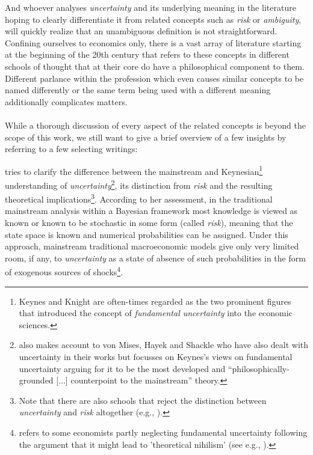 \documentclass[a4paper,11pt,listof=nochaptergap,oneside,pointednumbers,bibtotoc,bigheadings,liststotoc,hidelinks]{scrbook}
\theoremstyle{mysatz}
\theoremstyle{mydefinition}
\theoremstyle{mytheorem}
\theoremstyle{mybemerkung}
\begin{document}
And whoever analyses \textit{uncertainty} and its underlying meaning in the literature hoping to clearly differentiate it from related concepts such as \textit{risk} or \textit{ambiguity}, will quickly realize that an unambiguous definition is not straightforward. Confining ourselves to economics only, there is a vast array of literature starting at the beginning of the 20th century that refers to these concepts in different schools of thought that at their core do have a philosophical component to them. Different parlance within the profession which even causes similar concepts to be named differently \citep{dow:16} or the same term being used with a different meaning additionally complicates matters.\\
\\
While a thorough discussion of every aspect of the related concepts is beyond the scope of this work, we still want to give a brief overview of a few insights by referring to a few selecting writings:

\citet{dow:16} tries to clarify the difference between the mainstream and Keynesian\footnote{Keynes and Knight are often-times regarded as the two prominent figures that introduced the concept of \textit{fundamental uncertainty} into the economic sciences.} understanding of \textit{uncertainty}\footnote{\citet[p. 3]{dow:16} also makes account to von Mises, Hayek and Shackle who have also dealt with uncertainty in their works but focusses on Keynes's views on fundamental uncertainty arguing for it to be the most developed and ``philosophically-grounded [...] counterpoint to the mainstream'' theory.}, its distinction from \textit{risk} and the resulting theoretical implications\footnote{Note that there are also schools that reject the distinction between \textit{uncertainty} and \textit{risk} altogether (e.g., \citealp{savage:54}).}. According to her assessment, in the traditional mainstream analysis within a Bayesian framework most knowledge is viewed as known or known to be stochastic in some form (called \textit{risk}), meaning that the state space is known and numerical probabilities can be assigned. Under this approach, mainstream traditional macroeconomic models give only very limited room, if any, to \textit{uncertainty} as a state of absence of such probabilities in the form of exogenous sources of shocks\footnote{\citet[p. 43]{dequesh:00} refers to some economists partly neglecting fundamental uncertainty following the argument that it might lead to 'theoretical nihilism' (see e.g., \citealp{coddington:82}).}.
\end{document}
